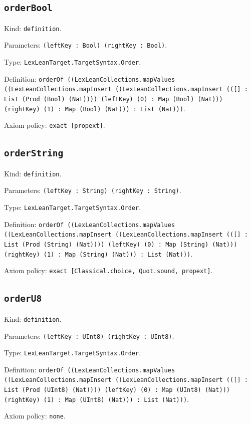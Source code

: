 \documentclass[11pt]{article}
\begin{document}
\subsection*{\texttt{orderBool}}
\noindent Kind: \texttt{definition}.\par
\noindent Parameters: \texttt{(leftKey : Bool) (rightKey : Bool)}.\par
\noindent Type: \texttt{LexLeanTarget.TargetSyntax.Order}.\par
\noindent Definition: \texttt{orderOf ((LexLeanCollections.mapValues ((LexLeanCollections.mapInsert ((LexLeanCollections.mapInsert (([] : List (Prod (Bool) (Nat)))) (leftKey) (0) : Map (Bool) (Nat))) (rightKey) (1) : Map (Bool) (Nat))) : List (Nat)))}.\par
\noindent Axiom policy: \texttt{exact [propext]}.\par
\subsection*{\texttt{orderString}}
\noindent Kind: \texttt{definition}.\par
\noindent Parameters: \texttt{(leftKey : String) (rightKey : String)}.\par
\noindent Type: \texttt{LexLeanTarget.TargetSyntax.Order}.\par
\noindent Definition: \texttt{orderOf ((LexLeanCollections.mapValues ((LexLeanCollections.mapInsert ((LexLeanCollections.mapInsert (([] : List (Prod (String) (Nat)))) (leftKey) (0) : Map (String) (Nat))) (rightKey) (1) : Map (String) (Nat))) : List (Nat)))}.\par
\noindent Axiom policy: \texttt{exact [Classical.choice, Quot.sound, propext]}.\par
\subsection*{\texttt{orderU8}}
\noindent Kind: \texttt{definition}.\par
\noindent Parameters: \texttt{(leftKey : UInt8) (rightKey : UInt8)}.\par
\noindent Type: \texttt{LexLeanTarget.TargetSyntax.Order}.\par
\noindent Definition: \texttt{orderOf ((LexLeanCollections.mapValues ((LexLeanCollections.mapInsert ((LexLeanCollections.mapInsert (([] : List (Prod (UInt8) (Nat)))) (leftKey) (0) : Map (UInt8) (Nat))) (rightKey) (1) : Map (UInt8) (Nat))) : List (Nat)))}.\par
\noindent Axiom policy: \texttt{none}.\par
\end{document}
